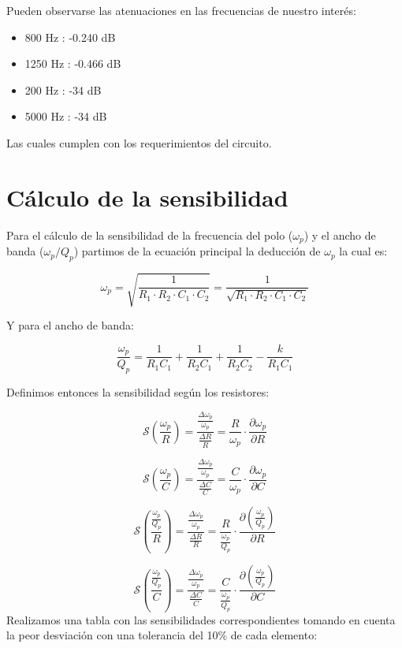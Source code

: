 \hspace{1mm} Pueden observarse las atenuaciones en las frecuencias de nuestro interés: 

\begin{itemize}
\item 800 Hz : -0.240 dB
\item 1250 Hz : -0.466 dB
\item 200 Hz : -34 dB
\item 5000 Hz : -34 dB
\end{itemize}
\hspace{1mm} Las cuales cumplen con los requerimientos del circuito.

\newpage

\section{Cálculo de la sensibilidad}
\hspace{1mm} Para el cálculo de la sensibilidad de la frecuencia del polo (\(\omega_p\)) y el ancho de banda (\(\omega_p / Q_p\)) partimos de la ecuación principal la deducción de \(\omega_p\) la cual es:

\[\omega_p = \sqrt{\frac{1}{R_1 \cdot R_2 \cdot C_1 \cdot C_2}} = \frac{1}{\sqrt{R_1 \cdot R_2 \cdot C_1 \cdot C_2}}\]

\hspace{1mm}Y para el ancho de banda:

\[\frac{\omega_p}{Q_p} = \frac{1}{R_1 C_1} + \frac{1}{R_2 C_1} + \frac{1}{R_2 C_2} - \frac{k}{R_1 C_1}\]

\hspace{1mm}Definimos entonces la sensibilidad según los resistores:

\[
\mathcal{S}\left(\frac{\omega_p}{R}\right) = \frac{\frac{\Delta \omega_p}{\omega_p}}{\frac{\Delta R}{R}} = \frac{R}{\omega_p} \cdot \frac{\partial \omega_p}{\partial R}
\]

\[
\mathcal{S}\left(\frac{\omega_p}{C}\right) = \frac{\frac{\Delta \omega_p}{\omega_p}}{\frac{\Delta C}{C}} = \frac{C}{\omega_p} \cdot \frac{\partial \omega_p}{\partial C}
\]

\[
\mathcal{S}\left(\frac{\frac{\omega_p}{Q_p}}{R}\right) = \frac{\frac{\Delta \omega_p}{\omega_p}}{\frac{\Delta R}{R}} = \frac{R}{\frac{\omega_p}{Q_p}} \cdot \frac{\partial \left(\frac{\omega_p}{Q_p}\right)}{\partial R}
\]

\[
\mathcal{S}\left(\frac{\frac{\omega_p}{Q_p}}{C}\right) = \frac{\frac{\Delta \omega_p}{\omega_p}}{\frac{\Delta C}{C}} = \frac{C}{\frac{\omega_p}{Q_p}} \cdot \frac{\partial \left(\frac{\omega_p}{Q_p}\right)}{\partial C}
\]
 \hspace{1mm} Realizamos una tabla con las sensibilidades correspondientes tomando en cuenta la peor desviación con una tolerancia del 10\% de cada elemento:

